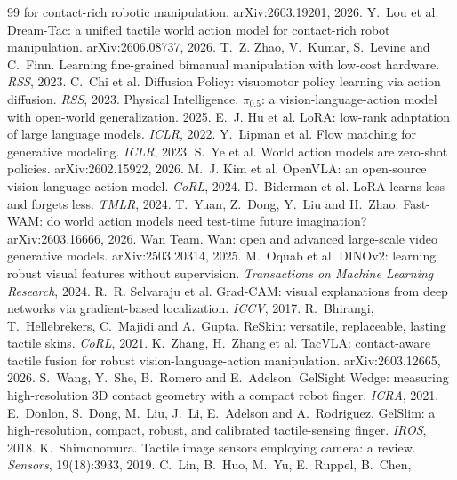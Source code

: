 \begin{thebibliography}{99}
for contact-rich robotic manipulation. arXiv:2603.19201, 2026.
 Y.~Lou et al. Dream-Tac: a unified tactile world action
model for contact-rich robot manipulation. arXiv:2606.08737, 2026.
 T.~Z. Zhao, V.~Kumar, S.~Levine and C.~Finn. Learning
fine-grained bimanual manipulation with low-cost hardware. \emph{RSS}, 2023.
 C.~Chi et al. Diffusion Policy: visuomotor policy
learning via action diffusion. \emph{RSS}, 2023.
 Physical Intelligence. $\pi_{0.5}$: a vision-language-action
model with open-world generalization. 2025.
 E.~J. Hu et al. LoRA: low-rank adaptation of large
language models. \emph{ICLR}, 2022.
 Y.~Lipman et al. Flow matching for generative
modeling. \emph{ICLR}, 2023.
 S.~Ye et al. World action models are zero-shot policies.
arXiv:2602.15922, 2026.
 M.~J. Kim et al. OpenVLA: an open-source
vision-language-action model. \emph{CoRL}, 2024.
 D.~Biderman et al. LoRA learns less and forgets less.
\emph{TMLR}, 2024.
 T.~Yuan, Z.~Dong, Y.~Liu and H.~Zhao. Fast-WAM: do world
action models need test-time future imagination? arXiv:2603.16666, 2026.
 Wan Team. Wan: open and advanced large-scale video generative
models. arXiv:2503.20314, 2025.
 M.~Oquab et al. DINOv2: learning robust visual
features without supervision. \emph{Transactions on Machine Learning Research},
2024.
 R.~R. Selvaraju et al. Grad-CAM: visual
explanations from deep networks via gradient-based localization. \emph{ICCV},
2017.
 R.~Bhirangi, T.~Hellebrekers, C.~Majidi and
A.~Gupta. ReSkin: versatile, replaceable, lasting tactile skins. \emph{CoRL},
2021.
 K.~Zhang, H.~Zhang et al. TacVLA: contact-aware
tactile fusion for robust vision-language-action manipulation.
arXiv:2603.12665, 2026.
 S.~Wang, Y.~She, B.~Romero and E.~Adelson. GelSight
Wedge: measuring high-resolution 3D contact geometry with a compact robot
finger. \emph{ICRA}, 2021.
 E.~Donlon, S.~Dong, M.~Liu, J.~Li, E.~Adelson and
A.~Rodriguez. GelSlim: a high-resolution, compact, robust, and calibrated
tactile-sensing finger. \emph{IROS}, 2018.
 K.~Shimonomura. Tactile image sensors employing
camera: a review. \emph{Sensors}, 19(18):3933, 2019.
 C.~Lin, B.~Huo, M.~Yu, E.~Ruppel, B.~Chen,

\end{thebibliography}
